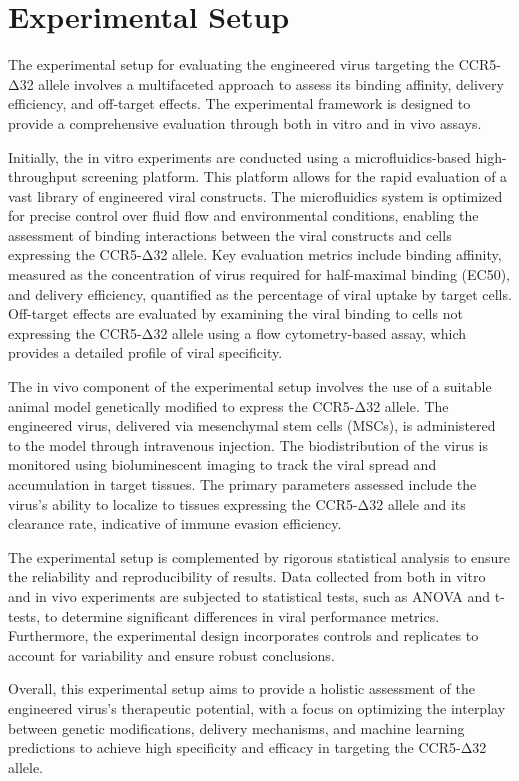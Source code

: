 \documentclass{article}
\begin{document}
\section{Experimental Setup}
The experimental setup for evaluating the engineered virus targeting the CCR5-Δ32 allele involves a multifaceted approach to assess its binding affinity, delivery efficiency, and off-target effects. The experimental framework is designed to provide a comprehensive evaluation through both in vitro and in vivo assays. 

Initially, the in vitro experiments are conducted using a microfluidics-based high-throughput screening platform. This platform allows for the rapid evaluation of a vast library of engineered viral constructs. The microfluidics system is optimized for precise control over fluid flow and environmental conditions, enabling the assessment of binding interactions between the viral constructs and cells expressing the CCR5-Δ32 allele. Key evaluation metrics include binding affinity, measured as the concentration of virus required for half-maximal binding (EC50), and delivery efficiency, quantified as the percentage of viral uptake by target cells. Off-target effects are evaluated by examining the viral binding to cells not expressing the CCR5-Δ32 allele using a flow cytometry-based assay, which provides a detailed profile of viral specificity.

The in vivo component of the experimental setup involves the use of a suitable animal model genetically modified to express the CCR5-Δ32 allele. The engineered virus, delivered via mesenchymal stem cells (MSCs), is administered to the model through intravenous injection. The biodistribution of the virus is monitored using bioluminescent imaging to track the viral spread and accumulation in target tissues. The primary parameters assessed include the virus's ability to localize to tissues expressing the CCR5-Δ32 allele and its clearance rate, indicative of immune evasion efficiency. 

The experimental setup is complemented by rigorous statistical analysis to ensure the reliability and reproducibility of results. Data collected from both in vitro and in vivo experiments are subjected to statistical tests, such as ANOVA and t-tests, to determine significant differences in viral performance metrics. Furthermore, the experimental design incorporates controls and replicates to account for variability and ensure robust conclusions.

Overall, this experimental setup aims to provide a holistic assessment of the engineered virus's therapeutic potential, with a focus on optimizing the interplay between genetic modifications, delivery mechanisms, and machine learning predictions to achieve high specificity and efficacy in targeting the CCR5-Δ32 allele.
\end{document}
